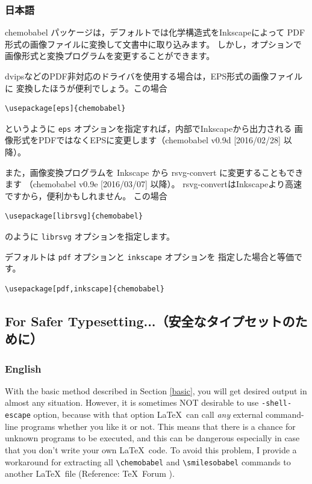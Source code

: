 \documentclass[dvipdfmx,12pt]{jsarticle}
\begin{document}
\clearpage

\subsubsection{日本語}

\textsf{chemobabel} パッケージは，デフォルトでは化学構造式をInkscapeによって
PDF形式の画像ファイルに変換して文書中に取り込みます。
しかし，オプションで画像形式と変換プログラムを変更することができます。

dvipsなどのPDF非対応のドライバを使用する場合は，EPS形式の画像ファイルに
変換したほうが便利でしょう。この場合
\begin{verbatim}
\usepackage[eps]{chemobabel}
\end{verbatim}
というように \verb|eps| オプションを指定すれば，内部でInkscapeから出力される
画像形式をPDFではなくEPSに変更します（\textsf{chemobabel} v0.9d [2016/02/28] 以降）。

また，画像変換プログラムを Inkscape から rsvg-convert に変更することもできます
（\textsf{chemobabel} v0.9e [2016/03/07] 以降）。
rsvg-convertはInkscapeより高速ですから，便利かもしれません。
この場合
\begin{verbatim}
\usepackage[librsvg]{chemobabel}
\end{verbatim}
のように \verb|librsvg| オプションを指定します。

デフォルトは \verb|pdf| オプションと \verb|inkscape| オプションを
指定した場合と等価です。
\begin{verbatim}
\usepackage[pdf,inkscape]{chemobabel}
\end{verbatim}

\clearpage

\subsection{For Safer Typesetting...（安全なタイプセットのために）} \label{extract}

\subsubsection{English}

With the basic method described in Section \ref{basic},
you will get desired output in almost any situation.
However, it is sometimes NOT desirable to use \verb|-shell-escape| option,
because with that option \LaTeX\ can call \emph{any} external command-line
programs whether you like it or not.
This means that there is a chance for unknown programs to be executed,
and this can be dangerous especially in case that you don't write your
own \LaTeX\ code. To avoid this problem, I provide a workaround for
extracting all \verb|\chemobabel| and \verb|\smilesobabel| commands
to another \LaTeX\ file (Reference: \TeX\ Forum \cite{OKU}).
\end{document}
